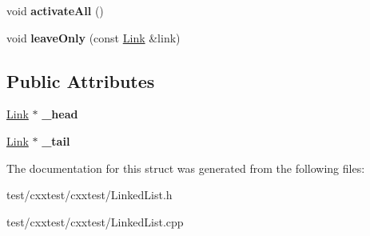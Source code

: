 \begin{DoxyCompactItemize}
\item 
\hypertarget{structCxxTest_1_1List_ac328920b5b9adea828e9a770018ea8ca}{void {\bfseries activate\-All} ()}\label{structCxxTest_1_1List_ac328920b5b9adea828e9a770018ea8ca}

\item 
\hypertarget{structCxxTest_1_1List_a19c10fc298d60550a44060c825a8916b}{void {\bfseries leave\-Only} (const \hyperlink{classCxxTest_1_1Link}{Link} \&link)}\label{structCxxTest_1_1List_a19c10fc298d60550a44060c825a8916b}

\end{DoxyCompactItemize}
\subsection*{Public Attributes}
\begin{DoxyCompactItemize}
\item 
\hypertarget{structCxxTest_1_1List_acc480ea2693f707cc1384f26b30476d7}{\hyperlink{classCxxTest_1_1Link}{Link} $\ast$ {\bfseries \-\_\-head}}\label{structCxxTest_1_1List_acc480ea2693f707cc1384f26b30476d7}

\item 
\hypertarget{structCxxTest_1_1List_adaecce9a86272940d93777f01918ca8f}{\hyperlink{classCxxTest_1_1Link}{Link} $\ast$ {\bfseries \-\_\-tail}}\label{structCxxTest_1_1List_adaecce9a86272940d93777f01918ca8f}

\end{DoxyCompactItemize}


The documentation for this struct was generated from the following files\-:\begin{DoxyCompactItemize}
\item 
test/cxxtest/cxxtest/Linked\-List.\-h\item 
test/cxxtest/cxxtest/Linked\-List.\-cpp\end{DoxyCompactItemize}
